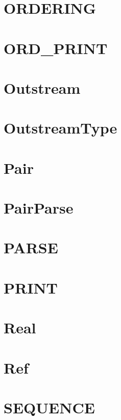 \newpage
\section{ORDERING}


\newpage
\section{ORD\_PRINT}


\newpage
\section{Outstream}


\newpage
\section{OutstreamType}


\newpage
\section{Pair}


\newpage
\section{PairParse}


\newpage
\section{PARSE}


\newpage
\section{PRINT}


\newpage
\section{Real}


\newpage
\section{Ref}


\newpage
\section{SEQUENCE}


